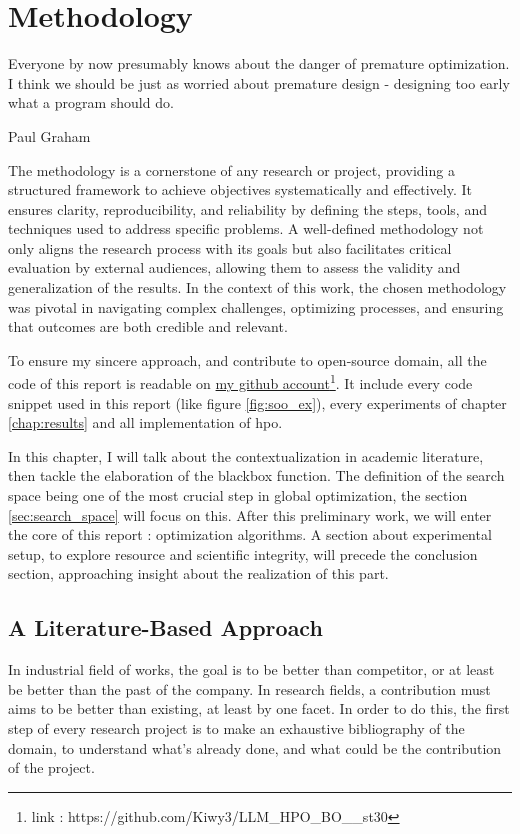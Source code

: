 \chapter{Methodology}
\label{chap:methodo}
\epigraph{Everyone by now presumably knows about the danger of premature optimization. I think we should be just as worried about premature design - designing too early what a program should do.}{Paul Graham}

The methodology is a cornerstone of any research or project, providing a structured framework to achieve objectives systematically and effectively. It ensures clarity, reproducibility, and reliability by defining the steps, tools, and techniques used to address specific problems. A well-defined methodology not only aligns the research process with its goals but also facilitates critical evaluation by external audiences, allowing them to assess the validity and generalization of the results. In the context of this work, the chosen methodology was pivotal in navigating complex challenges, optimizing processes, and ensuring that outcomes are both credible and relevant.

To ensure my sincere approach, and contribute to open-source domain, all the code of this report is readable on  \href{https://github.com/Kiwy3/LLM_HPO_BO__st30}{my github account}\footnote{link : https://github.com/Kiwy3/LLM\_HPO\_BO\_\_st30}. It include every code snippet used in this report (like figure \ref{fig:soo_ex}), every experiments of chapter \ref{chap:results} and all implementation of \acrshort{hpo}.

In this chapter, I will talk about the contextualization in academic literature, then tackle the elaboration of the blackbox function. The definition of the search space being one of the most crucial step in global optimization, the section \ref{sec:search_space} will focus on this. After this preliminary work, we will enter the core of this report : optimization algorithms. A section about experimental setup, to explore resource and scientific integrity, will precede the conclusion section, approaching insight about the realization of this part.


\section{A Literature-Based Approach}
In industrial field of works, the goal is to be better than competitor, or at least be better than the past of the company. In research fields, a contribution must aims to be better than existing, at least by one facet. In order to do this, the first step of every research project is to make an exhaustive bibliography of the domain, to understand what's already done, and what could be the contribution of the project. 

